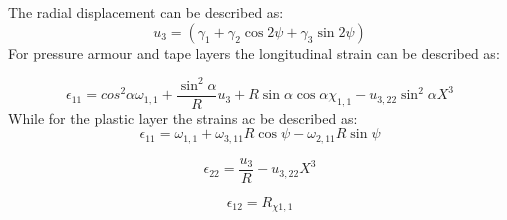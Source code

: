 \noindent The radial displacement can be described as:
\begin{equation}
    u_3=(\gamma_1 + \gamma_2 \cos 2 \psi + \gamma_3 \sin2 \psi)
\end{equation}
\noindent For pressure armour and tape layers the longitudinal strain can be described as:

\begin{equation}
    \epsilon_{11}=cos^2 \alpha \omega_{1,1} + \frac{\sin^2 \alpha}{R} u_3 + R \sin \alpha \cos \alpha \chi_{1,1}-u_{3,22} \sin^2 \alpha X^3
\end{equation}
While for the plastic layer the strains ac be described as:
\begin{equation}
    \epsilon_{11}=\omega_{1,1} + \omega_{3,11}R \cos \psi - \omega_{2,11}R \sin {\psi}
\end{equation}

\begin{equation}
    \epsilon_{22}=\frac{u_3}{R}-u_{3,22} X^3
\end{equation}

\begin{equation}
    \epsilon_{12}=R_{\chi 1,1}
\end{equation}

